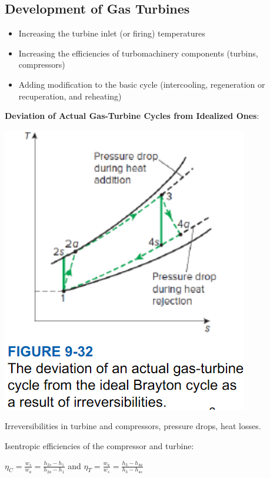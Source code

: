 \documentclass{article}
\begin{document}
\begin{multicols}{3}
    \subsection*{Development of Gas Turbines}
    \begin{itemize}
        \item Increasing the turbine inlet (or firing) temperatures
        \item Increasing the efficiencies of turbomachinery components (turbins, compressors)
        \item Adding modification to the basic cycle (intercooling, regeneration or recuperation, and reheating)
    \end{itemize}
    \textbf{Deviation of Actual Gas-Turbine Cycles from Idealized Ones}:\par
    \includegraphics[width=0.5\linewidth]{Images/non_ideal_cycles.png}\par 
    Irreversibilities in turbine and compressors, pressure drops, heat losses.\par 
    Isentropic efficiencies of the compressor and turbine:\par 
    $\eta_C=\frac{w_s}{w_a}=\frac{h_{2s}-h_1}{h_{2a}-h_1}$ and $\eta_T=\frac{w_a}{w_s}=\frac{h_3-h_{4a}}{h_3-h_{4s}}$\par 

\end{multicols}
\end{document}
